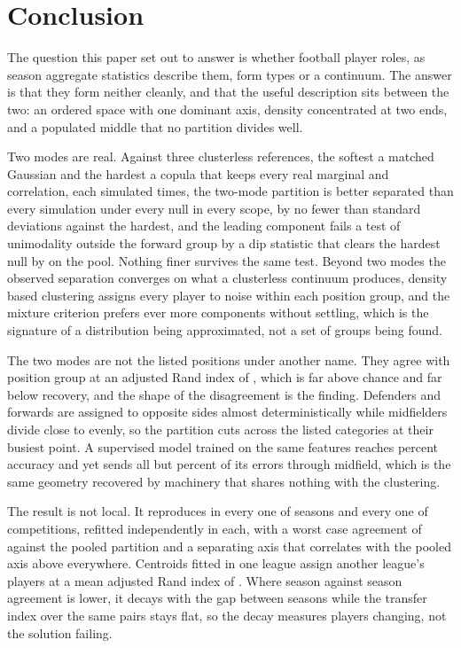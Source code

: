 \section{Conclusion}
\label{sec:conclusion}

The question this paper set out to answer is whether football player roles, as season
aggregate statistics describe them, form types or a continuum. The answer is that they form
neither cleanly, and that the useful description sits between the two: an ordered space with
one dominant axis, density concentrated at two ends, and a populated middle that no
partition divides well.

Two modes are real. Against three clusterless references, the softest a matched Gaussian
and the hardest a copula that keeps every real marginal and correlation, each simulated
\StrSimulations{} times, the two-mode partition is better separated than every simulation
under every null in every scope, by no fewer than \StrMinZOverall{} standard deviations
against the hardest, and the leading component fails a test of unimodality outside the
forward group by a dip statistic that clears the hardest null by \StrDipMinZAll{} on the
pool. Nothing finer survives the same test. Beyond two modes
the observed separation converges on what a clusterless continuum produces, density based
clustering assigns every player to noise within each position group, and the mixture
criterion prefers ever more components without settling, which is the signature of a
distribution being approximated, not a set of groups being found.

The two modes are not the listed positions under another name. They agree with position group
at an adjusted Rand index of \ArcARIvsPosition{}, which is far above chance and far below
recovery, and the shape of the disagreement is the finding. Defenders and forwards are
assigned to opposite sides almost deterministically while midfielders divide close to evenly,
so the partition cuts across the listed categories at their busiest point. A supervised model
trained on the same features reaches \SupGBMAcc{} percent accuracy and yet sends all but
\SupPoleShare{} percent of its errors through midfield, which is the same geometry recovered
by machinery that shares nothing with the clustering.

The result is not local. It reproduces in every one of \ArcNSeasons{} seasons and every one of
\ArcNLeagues{} competitions, refitted independently in each, with a worst case agreement of
\RepSeasonPooledMin{} against the pooled partition and a separating axis that correlates with
the pooled axis above \RepAxisCorrMin{} everywhere. Centroids fitted in one league assign
another league's players at a mean adjusted Rand index of \RepTransferMean{}. Where season
against season agreement is lower, it decays with the gap between seasons while the transfer
index over the same pairs stays flat, so the decay measures players changing, not the solution failing.

